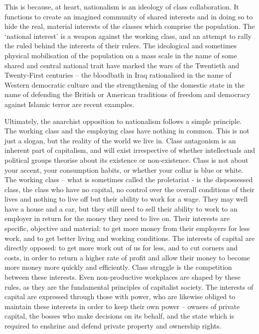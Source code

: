 This is because, at heart, nationalism is an ideology of class collaboration. It functions to create an imagined community of shared interests and in doing so to hide the real, material interests of the classes which comprise the population. The ‘national interest’ is a weapon against the working class, and an attempt to rally the ruled behind the interests of their rulers. The ideological and sometimes physical mobilisation of the population on a mass scale in the name of some shared and central national trait have marked the wars of the Twentieth and Twenty-First centuries – the bloodbath in Iraq rationalised in the name of Western democratic culture and the strengthening of the domestic state in the name of defending the British or American traditions of freedom and democracy against Islamic terror are recent examples.

Ultimately, the anarchist opposition to nationalism follows a simple principle. The working class and the employing class have nothing in common. This is not just a slogan, but the reality of the world we live in. Class antagonism is an inherent part of capitalism, and will exist irrespective of whether intellectuals and political groups theorise about its existence or non-existence. Class is not about your accent, your consumption habits, or whether your collar is blue or white. The working class – what is sometimes called the proletariat - is the dispossessed class, the class who have no capital, no control over the overall conditions of their lives and nothing to live off but their ability to work for a wage. They may well have a house and a car, but they still need to sell their ability to work to an employer in return for the money they need to live on. Their interests are specific, objective and material: to get more money from their employers for less work, and to get better living and working conditions. The interests of capital are directly opposed: to get more work out of us for less, and to cut corners and costs, in order to return a higher rate of profit and allow their money to become more money more quickly and efficiently. Class struggle is the competition between these interests. Even non-productive workplaces are shaped by these rules, as they are the fundamental principles of capitalist society. The interests of capital are expressed through those with power, who are likewise obliged to maintain these interests in order to keep their own power – owners of private capital, the bosses who make decisions on its behalf, and the state which is required to enshrine and defend private property and ownership rights.

